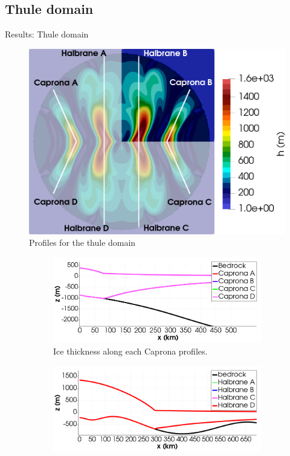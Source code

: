 \documentclass[11pt]{beamer}
\begin{document}
	\subsection{Thule domain}
		\begin{frame}[allowframebreaks]{Results: Thule domain}
			\justifying
			\begin{figure}
				\centering
				\includegraphics[scale=0.2]{../fig/Profiles_Thule_combined_domains_2_con_fondo.png}%
				\caption
				{%
					Profiles for the thule domain%
					\label{Profiles_Thule}%
				}%
			\end{figure}
			\begin{figure}
				\centering
				\begin{subfigure}{.5\textwidth}
					\centering
					\includegraphics[width=1\linewidth]{../fig/Capronas_Thule_Domain_con_fondo.png}
					\caption{Ice thickness along each Caprona profiles.}
					\label{Capronas_thule}
				\end{subfigure}%
				\begin{subfigure}{.5\textwidth}
					\centering
					\includegraphics[width=1\linewidth]{../fig/Halbranes_thule_domain_con_fondo.png}

\end{subfigure}
\end{figure}
\end{frame}
\end{document}
